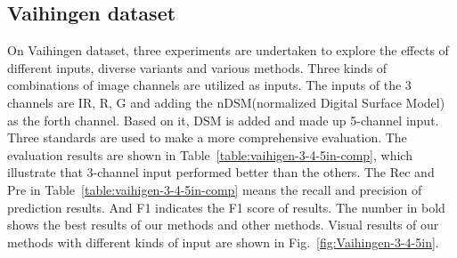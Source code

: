 \subsection{Vaihingen dataset}
On Vaihingen dataset, three experiments are undertaken to explore the effects of different inputs, diverse variants and various methods. Three kinds of combinations of image channels are utilized as inputs. The inputs of the 3 channels are IR, R, G and adding the nDSM(normalized Digital Surface Model) as the forth channel. Based on it, DSM is added and made up 5-channel input. Three standards are used to make a more comprehensive evaluation. The evaluation results are shown in Table~\ref{table:vaihigen-3-4-5in-comp}, which illustrate that 3-channel input performed better than the others.
The Rec and Pre in Table~\ref{table:vaihigen-3-4-5in-comp} means the recall and precision of prediction results. And F1 indicates the F1 score of results.
The number in bold shows the best results of our methods and other methods. 
Visual results of our methods with different kinds of input are shown in Fig.~\ref{fig:Vaihingen-3-4-5in}.



